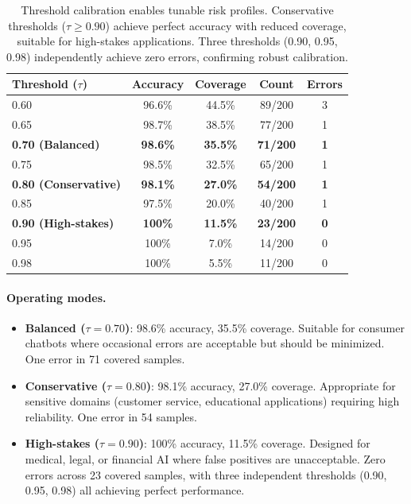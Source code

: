 \documentclass[11pt]{article}
\begin{document}
\begin{table}[h]
\centering
\caption{Threshold calibration enables tunable risk profiles. Conservative thresholds ($\tau \geq 0.90$) achieve perfect accuracy with reduced coverage, suitable for high-stakes applications. Three thresholds (0.90, 0.95, 0.98) independently achieve zero errors, confirming robust calibration.}
\label{tab:thresholds}
\begin{tabular}{lcccc}
\toprule
Threshold ($\tau$) & Accuracy & Coverage & Count & Errors \\
\midrule
0.60 & 96.6\% & 44.5\% & 89/200 & 3 \\
0.65 & 98.7\% & 38.5\% & 77/200 & 1 \\
\textbf{0.70 (Balanced)} & \textbf{98.6\%} & \textbf{35.5\%} & \textbf{71/200} & \textbf{1} \\
0.75 & 98.5\% & 32.5\% & 65/200 & 1 \\
\textbf{0.80 (Conservative)} & \textbf{98.1\%} & \textbf{27.0\%} & \textbf{54/200} & \textbf{1} \\
0.85 & 97.5\% & 20.0\% & 40/200 & 1 \\
\textbf{0.90 (High-stakes)} & \textbf{100\%} & \textbf{11.5\%} & \textbf{23/200} & \textbf{0} \\
0.95 & 100\% & 7.0\% & 14/200 & 0 \\
0.98 & 100\% & 5.5\% & 11/200 & 0 \\
\bottomrule
\end{tabular}
\end{table}

\paragraph{Operating modes.}
\begin{itemize}
\item \textbf{Balanced ($\tau=0.70$)}: 98.6\% accuracy, 35.5\% coverage. Suitable for consumer chatbots where occasional errors are acceptable but should be minimized. One error in 71 covered samples.

\item \textbf{Conservative ($\tau=0.80$)}: 98.1\% accuracy, 27.0\% coverage. Appropriate for sensitive domains (customer service, educational applications) requiring high reliability. One error in 54 samples.

\item \textbf{High-stakes ($\tau=0.90$)}: 100\% accuracy, 11.5\% coverage. Designed for medical, legal, or financial AI where false positives are unacceptable. Zero errors across 23 covered samples, with three independent thresholds (0.90, 0.95, 0.98) all achieving perfect performance.
\end{itemize}
\end{document}
